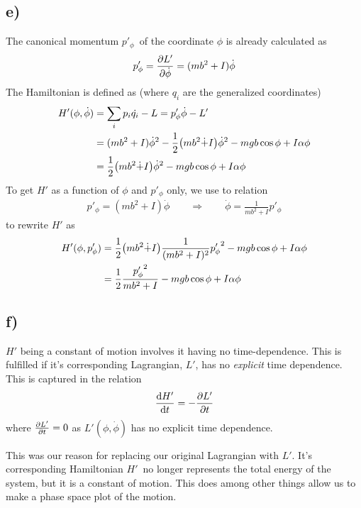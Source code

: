 \documentclass[12p,a4paper]{article}
\newcommand{\half}{\frac{1}{2}}
\begin{document}
\subsection*{e)}
The canonical momentum $p'_\phi$ of the coordinate $\phi$ is already calculated as
\begin{align*}
    p'_\phi = \pdv{L'}{\dot{\phi}} = (mb^2 + I)\dot{\phi}
\end{align*}
The Hamiltonian is defined as (where $q_i$ are the generalized coordinates)
\begin{align*}
    H'(\phi, \dot{\phi}) &= \sum_i p_i \dot{q_i} - L = p'_\phi \dot{\phi} - L' \\
    &= (mb^2 + I)\dot{\phi}^2 - \half \qty(m b^2\dot + I)\dot{\phi}^2 - mgb\cos{\phi} + I\alpha\phi \\
    &= \half \qty(m b^2\dot + I)\dot{\phi}^2 - mgb\cos{\phi} + I\alpha\phi
\end{align*}
To get $H'$ as a function of $\phi$ and $p'_\phi$ only, we use to relation
\begin{align*}
    p'_\phi = (mb^2 + I)\dot{\phi} \quad\quad \Rightarrow \quad\quad
    \dot{\phi} = \frac{1}{mb^2 + I}p'_\phi
\end{align*}
to rewrite $H'$ as
\begin{align*}
    H'(\phi, p'_\phi) &= \half \qty(m b^2\dot + I)\frac{1}{(mb^2 + I)^2}{p'_\phi}^2 - mgb\cos{\phi} + I\alpha\phi \\
    &= \half \frac{{p'_\phi}^2}{mb^2 + I} - mgb\cos{\phi} + I\alpha\phi \\
\end{align*}



\subsection*{f)}
$H'$ being a constant of motion involves it having no time-dependence. This is fulfilled if it's corresponding Lagrangian, $L'$, has no \textit{explicit} time dependence. This is captured in the relation
\[
    \dv{H'}{t} = - \pdv{L'}{t}
\]
where $\pdv{L'}{t} = 0$ as $L'(\phi, \dot{\phi})$ has no explicit time dependence.

This was our reason for replacing our original Lagrangian with $L'$. It's corresponding Hamiltonian $H'$ no longer represents the total energy of the system, but it is a constant of motion. This does among other things allow us to make a phase space plot of the motion.
\end{document}

